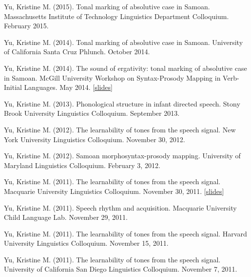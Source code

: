 \documentclass[10pt]{article}
\begin{document}
\begin{bibenum}
    \item Yu, Kristine M. (2015). Tonal marking of absolutive case in Samoan. Massachusetts Institute of
      Technology Linguistics Department Colloquium. February 2015.

    \item Yu, Kristine M. (2014). Tonal marking of absolutive case in
      Samoan. University of California Santa Cruz Phlunch. October 2014.

    \item Yu, Kristine M. (2014). The sound of ergativity: tonal
      marking of absolutive case in Samoan. McGill University Workshop
      on Syntax-Prosody Mapping in Verb-Initial Languages. May 2014. [\href{https://speakerdeck.com/krisyu/tonal-marking-of-absolutive-case-in-samoan}{slides}]

    \item Yu, Kristine M. (2013). Phonological structure in infant
      directed speech. Stony Brook University Linguistics Colloquium. September 2013.

    \item Yu, Kristine M. (2012). The learnability of tones from the
      speech signal. New York University Linguistics Colloquium. November 30, 2012. 

    \item Yu, Kristine M. (2012). Samoan morphosyntax-prosody
      mapping. University of Maryland Linguistics Colloquium. February
      3, 2012.

    \item Yu, Kristine M. (2011). The learnability of tones from the
      speech signal. Macquarie University Linguistics
      Colloquium. November 30, 2011. [\href{https://speakerdeck.com/krisyu/the-learnability-of-the-tones-from-the-speech-signal}{slides}]

    \item Yu, Kristine M. (2011). Speech rhythm and
      acquisition. Macquarie University Child Language Lab. November 29, 2011. 

    \item Yu, Kristine M. (2011). The learnability of tones from the
      speech signal. Harvard University Linguistics
      Colloquium. November 15, 2011.

    \item Yu, Kristine M. (2011). The learnability of tones from the
      speech signal. University of California San Diego Linguistics
      Colloquium. November 7, 2011. 


\end{bibenum}
\end{document}
